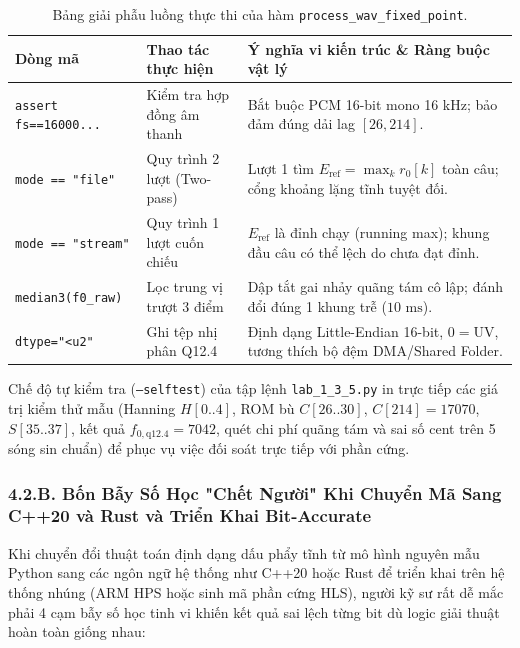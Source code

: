 \documentclass[11pt,a4paper]{article}
\begin{document}
\begin{table}[H]
\centering
\small
\begin{tabular}{@{}llp{8.5cm}@{}}
\toprule
\textbf{Dòng mã} & \textbf{Thao tác thực hiện} & \textbf{Ý nghĩa vi kiến trúc \& Ràng buộc vật lý} \\ \midrule
\texttt{assert fs==16000...} & Kiểm tra hợp đồng âm thanh & Bắt buộc PCM 16-bit mono 16 kHz; bảo đảm đúng dải lag $[26, 214]$. \\
\texttt{mode == "file"} & Quy trình 2 lượt (Two-pass) & Lượt 1 tìm $E_{\text{ref}} = \max_k r_0[k]$ toàn câu; cổng khoảng lặng tĩnh tuyệt đối. \\
\texttt{mode == "stream"} & Quy trình 1 lượt cuốn chiếu & $E_{\text{ref}}$ là đỉnh chạy (running max); khung đầu câu có thể lệch do chưa đạt đỉnh. \\
\texttt{median3(f0\_raw)} & Lọc trung vị trượt 3 điểm & Dập tắt gai nhảy quãng tám cô lập; đánh đổi đúng 1 khung trễ ($10\text{ ms}$). \\
\texttt{dtype="<u2"} & Ghi tệp nhị phân Q12.4 & Định dạng Little-Endian 16-bit, $0 = \text{UV}$, tương thích bộ đệm DMA/Shared Folder. \\ \bottomrule
\end{tabular}
\caption{Bảng giải phẫu luồng thực thi của hàm \texttt{process\_wav\_fixed\_point}.}
\label{tab:process_wav_breakdown}
\end{table}

Chế độ tự kiểm tra (\texttt{--selftest}) của tập lệnh \texttt{lab\_1\_3\_5.py} in trực tiếp các giá trị kiểm thử mẫu (Hanning $H[0..4]$, ROM bù $C[26..30]$, $C[214] = 17070$, $S[35..37]$, kết quả $f_{0,\text{q12.4}} = 7042$, quét chi phí quãng tám và sai số cent trên 5 sóng sin chuẩn) để phục vụ việc đối soát trực tiếp với phần cứng.



\subsubsection*{4.2.B. Bốn Bẫy Số Học "Chết Người" Khi Chuyển Mã Sang C++20 và Rust và Triển Khai Bit-Accurate}

Khi chuyển đổi thuật toán định dạng dấu phẩy tĩnh từ mô hình nguyên mẫu Python sang các ngôn ngữ hệ thống như C++20 hoặc Rust để triển khai trên hệ thống nhúng (ARM HPS hoặc sinh mã phần cứng HLS), người kỹ sư rất dễ mắc phải 4 cạm bẫy số học tinh vi khiến kết quả sai lệch từng bit dù logic giải thuật hoàn toàn giống nhau:
\end{document}
